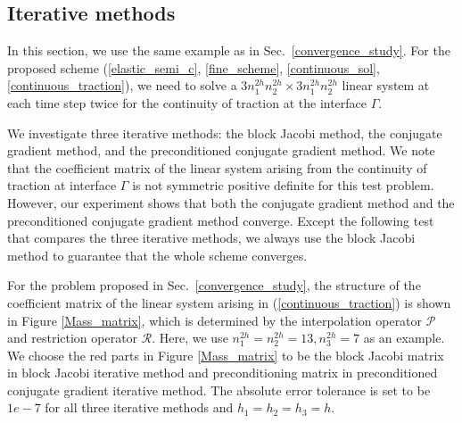 \subsection{Iterative methods}\label{iterative_section}
In this section, we use the same example as in Sec.~\ref{convergence_study}. For the proposed scheme (\ref{elastic_semi_c}, \ref{fine_scheme}, \ref{continuous_sol}, \ref{continuous_traction}), we need to solve a $3n_1^{2h}n_2^{2h}\times 3n_1^{2h}n_2^{2h}$ linear system at each time step twice for the continuity of traction at the interface $\Gamma$. 

We investigate three iterative methods: the block Jacobi method, the conjugate gradient method, and the preconditioned conjugate gradient method. We note that the coefficient matrix of the linear system arising from the continuity of traction at interface $\Gamma$ is not symmetric positive definite for this test problem. However, our experiment shows that both the conjugate gradient method and the preconditioned conjugate gradient method converge. Except the following test that compares the three iterative methods, we always use the block Jacobi method to guarantee that the whole scheme converges. 

For the problem proposed in Sec.~\ref{convergence_study}, the structure of the coefficient matrix of the linear system arising in (\ref{continuous_traction}) is shown in Figure \ref{Mass_matrix}, which is determined by the interpolation operator ${\mathcal{P}}$ and restriction operator ${\mathcal{R}}$. Here, we use $n_1^{2h} = n_2^{2h}=13, n_3^{2h} = 7$ as an example. We choose the red parts in Figure \ref{Mass_matrix} to be the block Jacobi matrix in block Jacobi iterative method and preconditioning matrix in preconditioned conjugate gradient iterative method. The absolute error tolerance is set to be $1e-7$ for all three iterative methods and $h_1 = h_2 = h_3 = h$.

